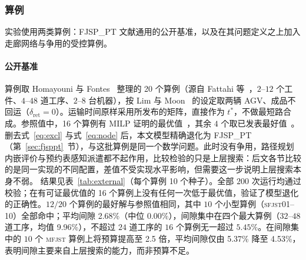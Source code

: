 \documentclass[manuscript,screen,review]{acmart}
\newcommand{\NSeeds}{10}
\newcommand{\PubNInst}{20}
\newcommand{\PubNOpt}{16}                 %
\newcommand{\PubNMatch}{12}               %
\newcommand{\PubGapMean}{2.68\%}          %
\newcommand{\PubGapMed}{0.00\%}
\newcommand{\PubGapBig}{9.96\%}           %
\newcommand{\PubBudgetRatio}{2.5}
\newcommand{\PubGapLoBudget}{5.37\%}      %
\newcommand{\PubGapHiBudget}{4.53\%}      %
\begin{document}
\subsubsection{算例}

实验使用两类算例：FJSP\_PT 文献通用的公开基准，以及在其问题定义之上加入走廊网络与争用的受控算例。

\paragraph{公开基准}
\label{sec:external}
算例取 Homayouni 与 Fontes~\cite{homayouni2021production} 整理的 \PubNInst{} 个算例（源自 Fattahi 等~\cite{fattahi2007mathematical}，$2$--$12$ 个工件、$4$--$48$ 道工序、$2$--$8$ 台机器），按 Lim 与 Moon~\cite{lim2023twophase} 的设定取两辆 AGV、成品不回运（$\delta_{\mathrm{ret}}=0$）。运输时间原样采用所发布的矩阵，直接作为 $t^{*}$，不做最短路合成。参照值中，\PubNOpt{} 个算例有 MILP 证明的最优值~\cite{homayouni2021production}，其余 $4$ 个取已发表最好值~\cite{lim2023twophase}。
删去式~\eqref{eq:excl} 与式~\eqref{eq:node} 后，本文模型精确退化为 FJSP\_PT（第~\ref{sec:fjsppt}~节），与这批算例是同一个数学问题。此时没有争用，路径规划内嵌评价与预约表感知派遣都不起作用，比较检验的只是上层搜索：后文各节比较的是同一实现的不同配置，差值不受实现水平影响，但需要这一步说明上层搜索本身不弱。
结果见表~\ref{tab:external}（每个算例 \NSeeds{} 个种子）。全部 $200$ 次运行均通过校验；在有可证最优值的 \PubNOpt{} 个算例上没有任何一次低于最优值，验证了模型退化的正确性。$\PubNMatch{}/\PubNInst{}$ 个算例的最好解与参照值相同，其中 $10$ 个小型算例（\textsc{sfjst}01--10）全部命中；平均间隙 \PubGapMean{}（中位 \PubGapMed{}），间隙集中在四个最大算例（$32$--$48$ 道工序，均值 \PubGapBig{}），不超过 $24$ 道工序的 $16$ 个算例无一超过 $5.45\%$。在间隙集中的 $10$ 个 \textsc{mfjst} 算例上将预算提高至 \PubBudgetRatio{} 倍，平均间隙仅由 \PubGapLoBudget{} 降至 \PubGapHiBudget{}，表明间隙主要来自上层搜索的能力，而非预算不足。

\begin{table}[t]
\caption{公开基准上的退化比较（删去争用约束，与文献同一问题）。「参照」列的
\textsc{opt} 为 MILP 证明的最优值、\textsc{bk} 为已发表最好值；间隙以 \NSeeds{} 个种子的最好
解计。星号标出最好解与参照值逐位相同者。}
\label{tab:external}
\centering
\small

\end{table}
\end{document}
